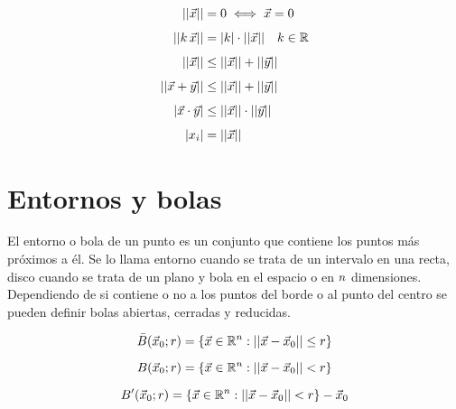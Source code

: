 
\begin{align*}
    {\left|\left| {\Vec{x}} \right|\right|} &= 0 \iff \Vec{x} = 0
    \\[1ex]
    {\left|\left| {k \, \Vec{x}} \right|\right|} &= {\left| {k} \right|} \cdot {\left|\left| {\Vec{x}} \right|\right|} \quad k\in\mathbb{R}
    \\[1ex]
    {\left|\left| {\Vec{x}} \right|\right|} &\leq {\left|\left| {\Vec{x}} \right|\right|} + {\left|\left| {\Vec{y}} \right|\right|}
    \\[1ex]
    {\left|\left| {\Vec{x}+\Vec{y}} \right|\right|} &\leq {\left|\left| {\Vec{x}} \right|\right|} + {\left|\left| {\Vec{y}} \right|\right|}
    \\[1ex]
    {\left| {\Vec{x} \cdot \Vec{y}} \right|} &\leq {\left|\left| {\Vec{x}} \right|\right|} \cdot {\left|\left| {\Vec{y}} \right|\right|}
    \\[1ex]
    {\left| {x_i} \right|} &= {\left|\left| {\Vec{x}} \right|\right|}
\end{align*}


\section{Entornos y bolas}

El entorno o bola de un punto es un conjunto que contiene los puntos más próximos a él.
Se lo llama entorno cuando se trata de un intervalo en una recta, disco cuando se trata de un plano y bola en el espacio o en $n$ dimensiones.
Dependiendo de si contiene o no a los puntos del borde o al punto del centro se pueden definir bolas abiertas, cerradas y reducidas.

\begin{mdframed}[style=DefinitionFrame]
    \begin{defn}
    \end{defn}
    \begin{equation*}
        \Bar{B} (\Vec{x}_0;r) = \{ \Vec{x} \in \mathbb{R}^n :  {\left|\left| {\Vec{x}-\Vec{x}_0} \right|\right|} \leq r \}
    \end{equation*}
\end{mdframed}

\begin{mdframed}[style=DefinitionFrame]
    \begin{defn}
    \end{defn}
    \begin{equation*}
        B(\Vec{x}_0;r) = \{ \Vec{x} \in \mathbb{R}^n : {\left|\left| {\Vec{x}-\Vec{x}_0} \right|\right|} <r \}
    \end{equation*}
\end{mdframed}

\begin{mdframed}[style=DefinitionFrame]
    \begin{defn}
    \end{defn}
    \begin{equation*}
        B' (\Vec{x}_0;r) = \{ \Vec{x} \in \mathbb{R}^n :  {\left|\left| {\Vec{x}-\Vec{x}_0} \right|\right|} <r \} - \Vec{x}_0
    \end{equation*}
\end{mdframed}

